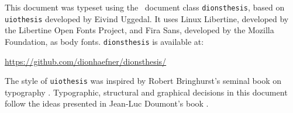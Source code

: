 \null
\vfill

{\color{largeornament}}

\vspace{3em}

This document was typeset using the \LaTeXe\ document class \texttt{dionsthesis}, based on \texttt{uiothesis} developed by Eivind Uggedal. It uses Linux Libertine, developed by the Libertine Open Fonts Project, and Fira Sans, developed by the Mozilla Foundation, as body fonts. \texttt{dionsthesis} is available at:
%
\begin{center}
\url{https://github.com/dionhaefner/dionsthesis/}
\end{center}
%
The style of \texttt{uiothesis} was inspired by Robert Bringhurst's seminal book on typography . Typographic, structural and graphical decisions in this document follow the ideas presented in Jean-Luc Doumont's book .
